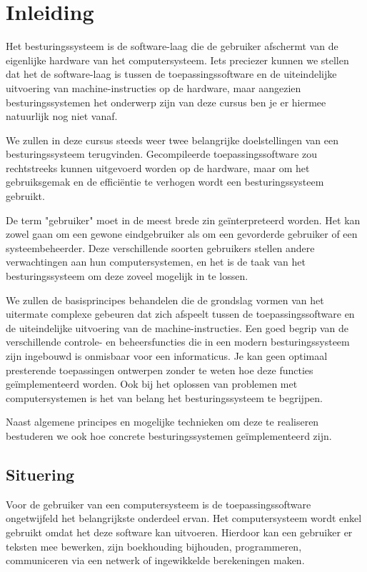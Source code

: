 \chapter{Inleiding}\label{hfdstk:inleiding}

Het besturingssysteem is de software-laag die de gebruiker afschermt
van de eigenlijke hardware van het computersysteem. Iets preciezer kunnen
we stellen dat het de software-laag is tussen de toepassingssoftware en de
uiteindelijke uitvoering van machine-instructies op de hardware, maar
aangezien besturingssystemen het onderwerp zijn van deze cursus ben je er
hiermee natuurlijk nog niet vanaf.

We zullen in deze cursus steeds weer twee belangrijke doelstellingen
van een besturingssysteem terugvinden. Gecompileerde toepassingssoftware
zou rechtstreeks kunnen uitgevoerd worden op de hardware, maar om het
gebruiksgemak en de effici\"entie te verhogen wordt een besturingssysteem
gebruikt.

De term "gebruiker" moet in de meest brede zin
ge\"interpreteerd worden. Het kan zowel gaan om een gewone eindgebruiker als
om een gevorderde gebruiker of een systeembeheerder. Deze verschillende
soorten gebruikers stellen andere verwachtingen aan hun computersystemen,
en het is de taak van het besturingssysteem om deze zoveel mogelijk in te
lossen.

We zullen de basisprincipes behandelen die de grondslag vormen van
het uitermate complexe gebeuren dat zich afspeelt tussen de
toepassingssoftware en de uiteindelijke uitvoering van de
machine-instructies. Een goed begrip van de verschillende controle- en
beheersfuncties die in een modern besturingssysteem zijn ingebouwd is
onmisbaar voor een informaticus. Je kan geen optimaal presterende
toepassingen ontwerpen zonder te weten hoe deze functies ge\"implementeerd
worden. Ook bij het oplossen van problemen met computersystemen is het van
belang het besturingssysteem te begrijpen.

Naast algemene principes en mogelijke technieken om deze te
realiseren bestuderen we ook hoe concrete besturingssystemen
ge\"implementeerd zijn.

\section{Situering}

Voor de gebruiker van een computersysteem is de
toepassingssoftware ongetwijfeld het belangrijkste onderdeel ervan. Het
computersysteem wordt enkel gebruikt omdat het deze software kan
uitvoeren. Hierdoor kan een gebruiker er teksten mee bewerken, zijn
boekhouding bijhouden, programmeren, communiceren via een netwerk of
ingewikkelde berekeningen maken.

